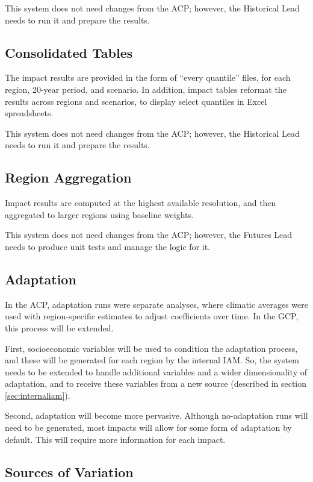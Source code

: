 \documentclass[12pt, oneside]{amsart}
\begin{document}
This system does not need changes from the ACP; however, the
Historical Lead needs to run it and prepare the results.

\subsection{Consolidated Tables}
\label{sec:tables}

The impact results are provided in the form of ``every quantile''
files, for each region, 20-year period, and scenario.  In addition,
impact tables reformat the results across regions and scenarios, to
display select quantiles in Excel spreadsheets.

This system does not need changes from the ACP; however, the
Historical Lead needs to run it and prepare the results.

\subsection{Region Aggregation}
\label{sec:aggregation}

Impact results are computed at the highest available resolution, and
then aggregated to larger regions using baseline weights.

This system does not need changes from the ACP; however, the Futures
Lead needs to produce unit tests and manage the logic for it.

\subsection{Adaptation}
\label{sec:adaptation}

In the ACP, adaptation runs were separate analyses, where climatic
averages were used with region-specific estimates to adjust
coefficients over time.  In the GCP, this process will be extended.

First, socioeconomic variables will be used to condition the
adaptation process, and these will be generated for each region by the
internal IAM.  So, the system needs to be extended to handle
additional variables and a wider dimensionality of adaptation, and to
receive these variables from a new source (described in section
\ref{sec:internaliam}).

Second, adaptation will become more pervasive.  Although no-adaptation
runs will need to be generated, most impacts will allow for some form
of adaptation by default.  This will require more information for each
impact.

\subsection{Sources of Variation}
\label{sec:variations}
\end{document}
